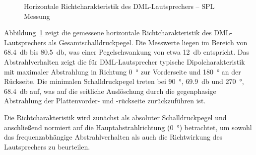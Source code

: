 \begin{figure}[H]
    \centering
    \caption{Horizontale Richtcharakteristik des DML-Lautsprechers -- SPL Messung}
    \label{fig:schallfeld_spl_messung}
\end{figure}

Abbildung~\ref{fig:schallfeld_spl_messung} zeigt die gemessene horizontale Richtcharakteristik des DML-Lautsprechers als Gesamtschalldruckpegel. Die Messwerte liegen im Bereich von \SI{68,4}{\decibel} bis \SI{80,5}{\decibel}, was einer Pegelschwankung von etwa \SI{12}{\decibel} entspricht. Das Abstrahlverhalten zeigt die für DML-Lautsprecher typische Dipolcharakteristik mit maximaler Abstrahlung in Richtung \SI{0}{\degree} zur Vorderseite und \SI{180}{\degree} an der Rückseite. Die minimalen Schalldruckpegel treten bei \SI{90}{\degree}, \SI{69,9}{\decibel} und \SI{270}{\degree}, \SI{68,4}{\decibel} auf, was auf die seitliche Auslöschung durch die gegenphasige Abstrahlung der Plattenvorder- und -rückseite zurückzuführen ist.



Die Richtcharakteristik wird zunächst als absoluter Schalldruckpegel und anschließend normiert auf die Hauptabstrahlrichtung (\SI{0}{\degree}) betrachtet, um sowohl das frequenzabhängige Abstrahlverhalten als auch die Richtwirkung des Lautsprechers zu beurteilen.


